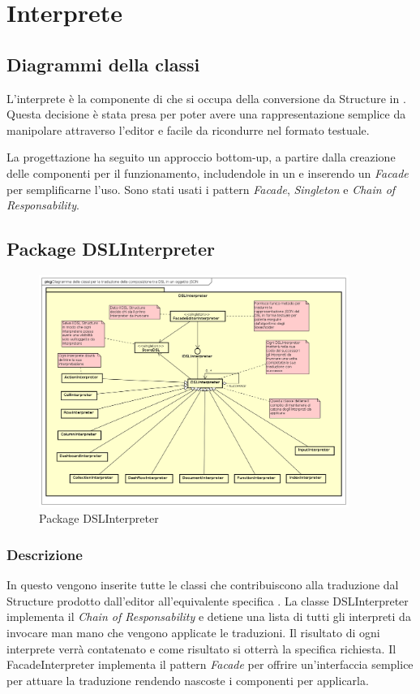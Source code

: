 \section{Interprete}
\subsection{Diagrammi della classi}
L'interprete è la componente di  che si occupa della conversione da  Structure in . Questa decisione è stata presa per poter avere una rappresentazione semplice da manipolare attraverso l'editor e facile da ricondurre nel formato testuale.

La progettazione ha seguito un approccio bottom-up, a partire dalla creazione delle componenti per il funzionamento, includendole in un  e inserendo un \textit{Facade} per semplificarne l'uso. Sono stati usati i pattern \textit{Facade}, \textit{Singleton} e \textit{Chain of Responsability}.
\subsection{Package DSLInterpreter}
\begin{figure}[H]
  \centering
  \includegraphics[width=0.9\textwidth]{res/img/Diagram_Interpreter.png}
  \caption{Package DSLInterpreter}
  \label{fig:diagram_interpreter}
\end{figure}
\subsubsection{Descrizione}
In questo  vengono inserite tutte le classi che contribuiscono alla traduzione dal  Structure prodotto dall'editor all'equivalente specifica .
La classe DSLInterpreter implementa il \textit{Chain of Responsability} e detiene una lista di tutti gli interpreti da invocare man mano che vengono applicate le traduzioni. Il risultato di ogni interprete verrà contatenato e come risultato si otterrà la specifica  richiesta.
Il FacadeInterpreter implementa il pattern \textit{Facade} per offrire un'interfaccia semplice per attuare la traduzione rendendo nascoste i componenti per applicarla.
